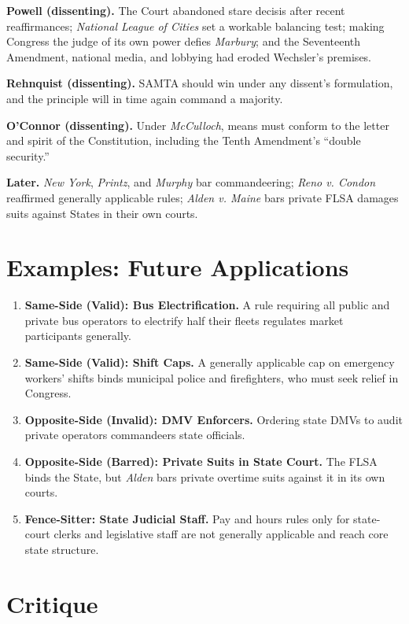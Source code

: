 \documentclass[12pt]{article}
\begin{document}
\textbf{Powell (dissenting).} The Court abandoned stare decisis after recent reaffirmances; \textit{National League of Cities} set a workable balancing test; making Congress the judge of its own power defies \textit{Marbury}; and the Seventeenth Amendment, national media, and lobbying had eroded Wechsler's premises.

\textbf{Rehnquist (dissenting).} SAMTA should win under any dissent's formulation, and the principle will in time again command a majority.

\textbf{O'Connor (dissenting).} Under \textit{McCulloch}, means must conform to the letter and spirit of the Constitution, including the Tenth Amendment's ``double security.''

\textbf{Later.} \textit{New York}, \textit{Printz}, and \textit{Murphy} bar commandeering; \textit{Reno v. Condon} reaffirmed generally applicable rules; \textit{Alden v. Maine} bars private FLSA damages suits against States in their own courts.

\section{Examples: Future Applications}

\begin{enumerate}
\item \textbf{Same-Side (Valid): Bus Electrification.} A rule requiring all public and private bus operators to electrify half their fleets regulates market participants generally.
\item \textbf{Same-Side (Valid): Shift Caps.} A generally applicable cap on emergency workers' shifts binds municipal police and firefighters, who must seek relief in Congress.
\item \textbf{Opposite-Side (Invalid): DMV Enforcers.} Ordering state DMVs to audit private operators commandeers state officials.
\item \textbf{Opposite-Side (Barred): Private Suits in State Court.} The FLSA binds the State, but \textit{Alden} bars private overtime suits against it in its own courts.
\item \textbf{Fence-Sitter: State Judicial Staff.} Pay and hours rules only for state-court clerks and legislative staff are not generally applicable and reach core state structure.
\end{enumerate}

\section{Critique}
\end{document}

